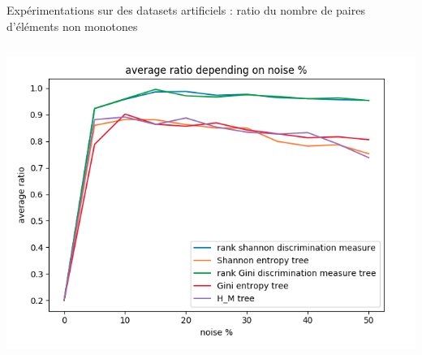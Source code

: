 \documentclass[usenames,dvipsnames]{beamer}
\begin{document}
\begin{frame}{Expérimentations sur des datasets artificiels : ratio du nombre de paires d'éléments non monotones}
\begin{columns}
\begin{column}{0.45\textwidth}
            \includegraphics[width=\textwidth]{ratio_5.png}
        \end{column}
    \end{columns}

\end{frame}
\end{document}
